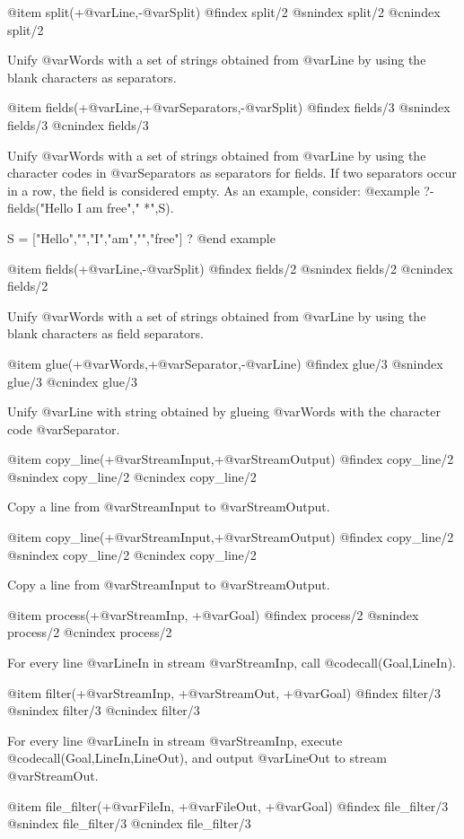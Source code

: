 {{{{{{{{{@item split(+@var{Line},-@var{Split})
@findex split/2
@snindex split/2
@cnindex split/2

Unify @var{Words} with a set of strings obtained from @var{Line} by
using the blank characters  as separators.

@item fields(+@var{Line},+@var{Separators},-@var{Split})
@findex fields/3
@snindex fields/3
@cnindex fields/3

Unify @var{Words} with a set of strings obtained from @var{Line} by
using the character codes in @var{Separators} as separators for
fields. If two separators occur in a row, the field is considered
empty. As an example, consider:
@example
?- fields("Hello  I am  free"," *",S).

S = ["Hello","","I","am","","free"] ?
@end example

@item fields(+@var{Line},-@var{Split})
@findex fields/2
@snindex fields/2
@cnindex fields/2

Unify @var{Words} with a set of strings obtained from @var{Line} by
using the blank characters  as field separators.

@item glue(+@var{Words},+@var{Separator},-@var{Line})
@findex glue/3
@snindex glue/3
@cnindex glue/3

Unify @var{Line} with  string obtained by glueing @var{Words} with
the character code @var{Separator}.

@item copy_line(+@var{StreamInput},+@var{StreamOutput})
@findex copy_line/2
@snindex copy_line/2
@cnindex copy_line/2

Copy a line from @var{StreamInput} to @var{StreamOutput}.

@item copy_line(+@var{StreamInput},+@var{StreamOutput})
@findex copy_line/2
@snindex copy_line/2
@cnindex copy_line/2

Copy a line from @var{StreamInput} to @var{StreamOutput}.

@item process(+@var{StreamInp}, +@var{Goal})
@findex process/2
@snindex process/2
@cnindex process/2

For every line @var{LineIn} in stream @var{StreamInp}, call
@code{call(Goal,LineIn)}.

@item filter(+@var{StreamInp}, +@var{StreamOut}, +@var{Goal})
@findex filter/3
@snindex filter/3
@cnindex filter/3

For every line @var{LineIn} in stream @var{StreamInp}, execute
@code{call(Goal,LineIn,LineOut)}, and output @var{LineOut} to
stream @var{StreamOut}.

@item file_filter(+@var{FileIn}, +@var{FileOut}, +@var{Goal})
@findex file_filter/3
@snindex file_filter/3
@cnindex file_filter/3

}}}}}}}}}
